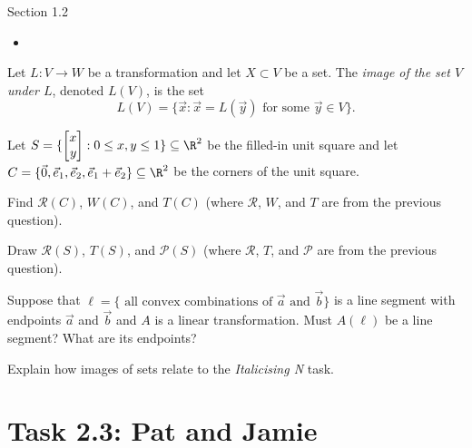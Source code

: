 \documentclass{problemset}
\newcommand{\mat}[1]{\begin{bmatrix*}[r]#1\end{bmatrix*}}
\begin{document}
\begin{lesson}
	\newpage

	Section 1.2

	\begin{itemize}
		\item 
	\end{itemize}


	\newpage
\end{lesson}
	\begin{definition}
		Let $L:V\to W$ be a transformation and let $X\subset V$ be a set.
		The \emph{image of the set $V$ under $L$}, denoted $L(V)$, is the set
		\[
			L(V)=\{\vec x: \vec x=L(\vec y)\text{ for some }\vec y\in V\}.
		\]
	\end{definition}

	\question
	Let $S=\{\mat{x\\y}:0\leq x,y\leq 1\}\subseteq \R^2$ be the filled-in unit square
	and let $C=\{\vec 0, \vec e_1,\vec e_2,\vec e_1+\vec e_2\}\subseteq \R^2$ be the corners of the 
	unit square.
	\begin{parts}
		\item Find $\mathcal R(C)$, $W(C)$, and $T(C)$ (where $\mathcal R$, $W$,
			and $T$ are from the previous question).
		\item Draw $\mathcal R(S)$, $T(S)$, and $\mathcal P(S)$ (where $\mathcal R$, $T$,
			and $\mathcal P$ are from the previous question).
		\item Suppose that $\ell=\{\text{ all convex combinations of }\vec a\text{ and }\vec b\}$
			is a line segment with endpoints $\vec a$ and $\vec b$
			and $A$ is a linear transformation. Must $A(\ell)$ be a line segment? What are
			its endpoints?
		\item Explain how images of sets relate to the \emph{Italicising N} task.
	\end{parts}

\newpage
\pagestyle{iola}
\section*{Task 2.3: Pat and Jamie}
\end{document}
